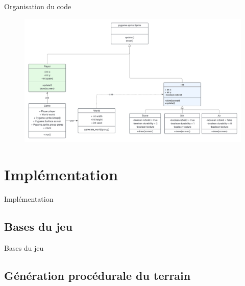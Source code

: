 \documentclass[aspectratio=169]{beamer}
\begin{document}
\begin{frame}{Organisation du code}
    \begin{figure}
        \includegraphics[height=0.8\textheight]{assets/UML_class.png}
    \end{figure}
\end{frame}


\section{Implémentation}

\begin{frame}{Implémentation}
    \tableofcontents[sections={4}]
\end{frame}

\subsection{Bases du jeu}

\begin{frame}{Bases du jeu}
    \lipsum[1][1-5]
\end{frame}

\subsection{Génération procédurale du terrain}
\end{document}
